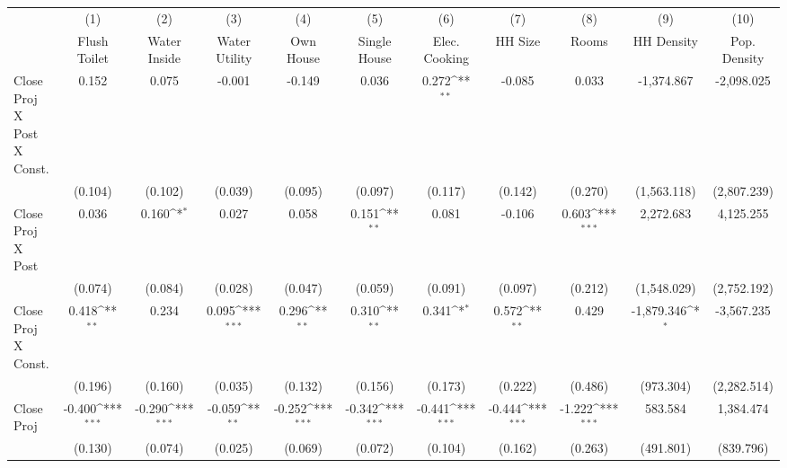 {
\def\sym#1{\ifmmode^{#1}\else\(^{#1}\)\fi}
\begin{tabular}{l*{10}{c}}
\hline\hline
                &\multicolumn{1}{c}{(1)}&\multicolumn{1}{c}{(2)}&\multicolumn{1}{c}{(3)}&\multicolumn{1}{c}{(4)}&\multicolumn{1}{c}{(5)}&\multicolumn{1}{c}{(6)}&\multicolumn{1}{c}{(7)}&\multicolumn{1}{c}{(8)}&\multicolumn{1}{c}{(9)}&\multicolumn{1}{c}{(10)}\\
                &\multicolumn{1}{c}{Flush Toilet}&\multicolumn{1}{c}{Water Inside}&\multicolumn{1}{c}{Water Utility}&\multicolumn{1}{c}{Own House}&\multicolumn{1}{c}{Single House}&\multicolumn{1}{c}{Elec. Cooking}&\multicolumn{1}{c}{HH Size}&\multicolumn{1}{c}{Rooms}&\multicolumn{1}{c}{HH Density}&\multicolumn{1}{c}{Pop. Density}\\
\hline
Close Proj X Post X Const.&    0.152         &    0.075         &   -0.001         &   -0.149         &    0.036         &    0.272\sym{**} &   -0.085         &    0.033         &-1,374.867         &-2,098.025         \\
                &  (0.104)         &  (0.102)         &  (0.039)         &  (0.095)         &  (0.097)         &  (0.117)         &  (0.142)         &  (0.270)         &(1,563.118)         &(2,807.239)         \\
[1em]
Close Proj X Post&    0.036         &    0.160\sym{*}  &    0.027         &    0.058         &    0.151\sym{**} &    0.081         &   -0.106         &    0.603\sym{***}&2,272.683         &4,125.255         \\
                &  (0.074)         &  (0.084)         &  (0.028)         &  (0.047)         &  (0.059)         &  (0.091)         &  (0.097)         &  (0.212)         &(1,548.029)         &(2,752.192)         \\
[1em]
Close Proj X Const.&    0.418\sym{**} &    0.234         &    0.095\sym{***}&    0.296\sym{**} &    0.310\sym{**} &    0.341\sym{*}  &    0.572\sym{**} &    0.429         &-1,879.346\sym{*}  &-3,567.235         \\
                &  (0.196)         &  (0.160)         &  (0.035)         &  (0.132)         &  (0.156)         &  (0.173)         &  (0.222)         &  (0.486)         &(973.304)         &(2,282.514)         \\
[1em]
Close Proj      &   -0.400\sym{***}&   -0.290\sym{***}&   -0.059\sym{**} &   -0.252\sym{***}&   -0.342\sym{***}&   -0.441\sym{***}&   -0.444\sym{***}&   -1.222\sym{***}&  583.584         &1,384.474         \\
                &  (0.130)         &  (0.074)         &  (0.025)         &  (0.069)         &  (0.072)         &  (0.104)         &  (0.162)         &  (0.263)         &(491.801)         &(839.796)         \\

\end{tabular}}
